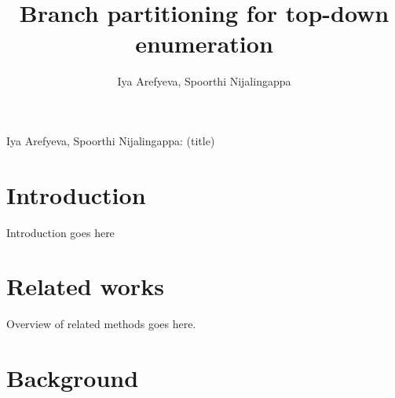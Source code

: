 \documentclass[10pt,journal,compsoc]{IEEEtran}
\begin{document}
\title{Branch partitioning for top-down enumeration}
\author{Iya Arefyeva,  Spoorthi Nijalingappa}%




\markboth{}%
{{Iya Arefyeva, Spoorthi Nijalingappa}: (title)}


\maketitle


\IEEEdisplaynontitleabstractindextext

\IEEEpeerreviewmaketitle


\ifCLASSOPTIONcompsoc
{}
\else
\section{Introduction}
\label{sec:introduction}
\fi

Introduction goes here

\section{Related works}
Overview of related methods goes here.

\section{Background}
\end{document}
